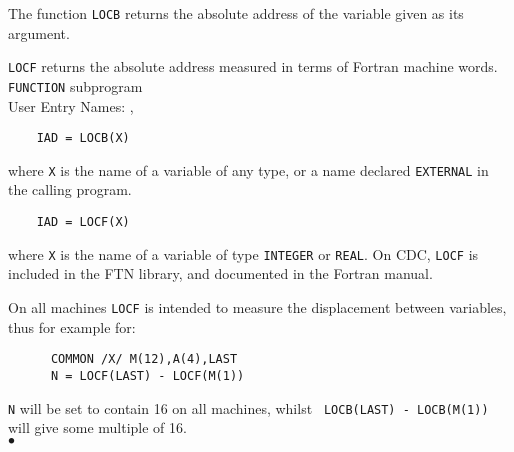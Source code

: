                             
                               
                         
       
The function {\tt LOCB} returns the absolute address of the variable
given as its argument.
\par
{\tt LOCF} returns the absolute address measured in terms of
Fortran machine words.
\Structure
{\tt FUNCTION} subprogram \\
User Entry Names: , 
\Usage
\begin{verbatim}
    IAD = LOCB(X)
\end{verbatim}
where {\tt X} is the name of a variable of any type,
or a name declared {\tt EXTERNAL} in the calling program.
\begin{verbatim}
    IAD = LOCF(X)
\end{verbatim}
where {\tt X} is the name of a variable of type {\tt INTEGER}
or {\tt REAL}.
\Notes
On CDC, {\tt LOCF} is included in the FTN library, and documented in
the Fortran manual.
\par
On all machines {\tt LOCF} is intended to measure the displacement
between variables, thus for example for:
\begin{verbatim}
      COMMON /X/ M(12),A(4),LAST
      N = LOCF(LAST) - LOCF(M(1))
\end{verbatim}
{\tt N} will be set to contain 16 on all machines, whilst
\verb" LOCB(LAST) - LOCB(M(1)) " will give some multiple of 16.
\\ $\bullet$
